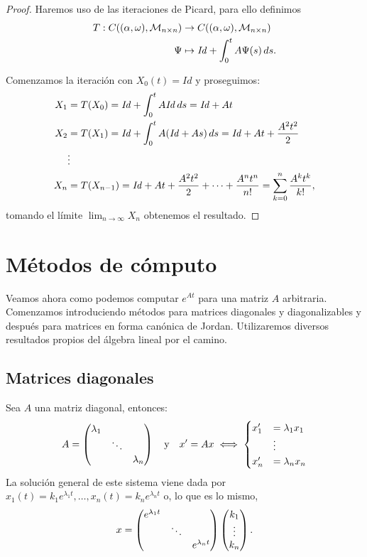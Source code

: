 \documentclass[../ecuaciones_diferenciales.tex]{subfiles}
\begin{document}
\begin{proof}
	Haremos uso de las iteraciones de Picard, para ello definimos
	\begin{align*}
		T : C((\alpha, \omega), \mathcal{M}_{n \times n}) & \to
		C((\alpha, \omega), \mathcal{M}_{n \times n})                                                        \\
		\Psi                                              & \mapsto \mathit{Id} + \int_0^t A \Psi(s) \mathop{d\!} s.
	\end{align*}

	Comenzamos la iteración con \(X_0(t) = \mathit{Id}\) y proseguimos:
	\begin{align*}
		X_1 & = T(X_0) = \mathit{Id} + \int_0^t A \mathit{Id} \mathop{d\!} s =
		\mathit{Id} + At                                                      \\
		X_2 & = T(X_1) = \mathit{Id} + \int_0^t A (\mathit{Id} + As) \mathop{d\!} s =
		\mathit{Id} + At + \frac{A^2 t^2}{2}                                  \\
		    & \vdots                                                          \\
		X_n & = T(X_{n - 1}) =
		\mathit{Id} + At + \frac{A^2 t^2}{2} + \cdots + \frac{A^n t^n}{n!}
		= \sum_{k = 0}^n \frac{A^k t^k}{k!},
	\end{align*}
	tomando el límite \(\lim_{n \to \infty} X_n\) obtenemos el resultado.
\end{proof}

\section{Métodos de cómputo}

Veamos ahora como podemos computar \(e^{At}\) para una matriz \(A\) arbitraria.
Comenzamos introduciendo métodos para matrices diagonales y diagonalizables y
después para matrices en forma canónica de Jordan. Utilizaremos diversos
resultados propios del álgebra lineal por el camino.

\subsection{Matrices diagonales}

Sea \(A\) una matriz diagonal, entonces:
\[A = \begin{pmatrix}
		\lambda_1 & & \\
		& \ddots & \\
		& & \lambda_n
	\end{pmatrix}
	\quad \text{y} \quad
	x' = Ax \iff
	\begin{cases}
		x'_1 &= \lambda_1 x_1 \\
		&\vdots \\
		x'_n &= \lambda_n x_n \\
	\end{cases}
\]
La solución general de este sistema viene dada por
\(x_1(t) = k_1 e^{\lambda_1 t}, \dots, x_n(t) = k_n e^{\lambda_n t}\) o, lo que es
lo mismo,
\[x = \begin{pmatrix}e^{\lambda_1 t} & & \\ & \ddots & \\ & & e^{\lambda_n t}\end{pmatrix}
	\begin{pmatrix}k_1 \\ \vdots \\ k_n\end{pmatrix}.\]
\end{document}
